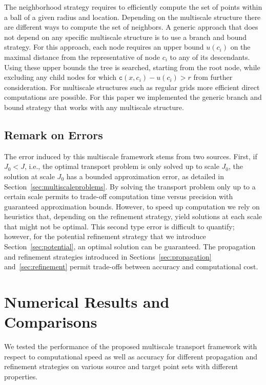 \documentclass[twoside,11pt]{article}
\newcommand{\cost}[0]{\mathtt{c}}
\begin{document}
The neighborhood strategy requires to efficiently compute the set of points
within a ball of a given radius and location. Depending on the multiscale
structure there are different ways to compute the set of neighbors. A generic
approach that does not depend on any specific multiscale structure is to use a
branch and bound strategy. For this approach, each node requires an upper bound
$u(c_i)$ on the maximal distance from the representative of node $c_i$ to any of
its descendants. Using these upper bounds the tree is searched, starting from
the root node, while excluding any child nodes for which $\cost(x, c_i) - u(c_i) >
r$ from further consideration.  For multiscale structures such as regular grids
more efficient direct computations are possible. For this paper we implemented
the generic branch and bound strategy that works with any multiscale structure. 


\subsection{Remark on Errors}
The error induced by this multiscale framework stems from two sources.  First, if
$J_0<J$, i.e., the optimal transport problem is only solved up to scale $J_0$,
the solution at scale $J_0$ has a bounded approximation error, as detailed in
Section~\ref{sec:multiscaleproblems}.  By solving the transport problem only up
to a certain scale permits to trade-off computation time versus precision with
guaranteed approximation bounds.  However, to speed up computation we rely on
heuristics that, depending on the refinement strategy, yield solutions at each
scale that might not be optimal. This second type error is difficult to
quantify; however, for the potential refinement strategy that we introduce
Section~\ref{sec:potential}, an optimal solution can be guaranteed.  The
propagation and refinement strategies introduced in
Sections~\ref{sec:propagation} and~\ref{sec:refinement} permit trade-offs
between accuracy and computational cost. 




\section{Numerical Results and Comparisons}
\label{sec:results}
We tested the performance of the proposed multiscale transport framework with
respect to computational speed as well as accuracy for different propagation
and refinement strategies on various source and target point sets with
different properties.
\end{document}
